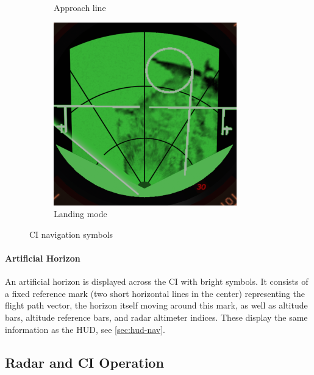 \begin{figure}[!ht]
\begin{subfigure}[t]{0.3\textwidth}
    \caption{Approach line}
    \label{fig:CI-navigation-runway}
  \end{subfigure}
  \begin{subfigure}[t]{0.3\textwidth}
    \includegraphics[width=\textwidth]{images/displays/CI-landing.png}
    \caption{Landing mode}
    \label{fig:CI-navigation-landing}
  \end{subfigure}

  \caption{CI navigation symbols}
  \label{fig:CI-navigation}
\end{figure}

\paragraph{Artificial Horizon}
An artificial horizon is displayed across the CI with bright symbols.
It consists of a fixed reference mark (two short horizontal lines in the center) representing the flight path vector,
the horizon itself moving around this mark,
as well as altitude bars, altitude reference bars, and radar altimeter indices.
These display the same information as the HUD, see \cref{sec:hud-nav}.


\subsection{Radar and CI Operation}

